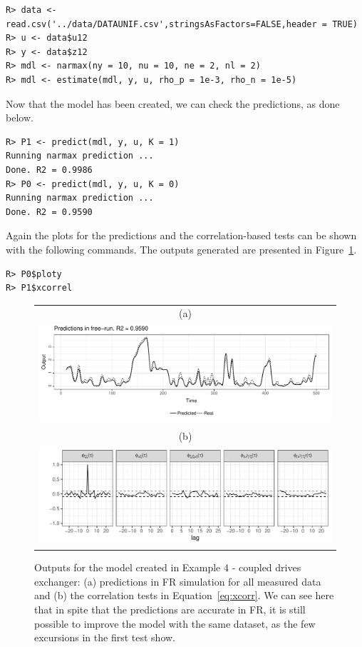 \documentclass[preprint,12pt, a4paper]{elsarticle}
\begin{document}
\begin{verbatim}
R> data <- read.csv('../data/DATAUNIF.csv',stringsAsFactors=FALSE,header = TRUE)
R> u <- data$u12
R> y <- data$z12
R> mdl <- narmax(ny = 10, nu = 10, ne = 2, nl = 2)
R> mdl <- estimate(mdl, y, u, rho_p = 1e-3, rho_n = 1e-5)
\end{verbatim}

Now that the model has been created, we can check the predictions, as done below. 

\begin{verbatim}
R> P1 <- predict(mdl, y, u, K = 1)
Running narmax prediction ... 
Done. R2 = 0.9986           
R> P0 <- predict(mdl, y, u, K = 0)
Running narmax prediction ... 
Done. R2 = 0.9590    
\end{verbatim}

Again the plots for the predictions and the correlation-based tests can be shown with the following commands. The outputs generated are presented in Figure~\ref{fig:ex4}.

\begin{verbatim}
R> P0$ploty
R> P1$xcorrel
\end{verbatim}

\begin{figure}[t!]
	\centering
	\begin{tabular}{c}
		(a) \\
		\includegraphics[width=15cm,keepaspectratio]{ex4y}  \\ 
		(b) \\
		\includegraphics[width=15cm,keepaspectratio]{ex4xc}
	\end{tabular}
	\caption{Outputs for the model created in Example 4 - coupled drives exchanger: (a) predictions in FR simulation for all measured data and (b) the correlation tests in Equation~\ref{eq:xcorr}. We can see here that in spite that the predictions are accurate in FR, it is still possible to improve the model with the same dataset, as the few excursions in the first test show.} \label{fig:ex4}
\end{figure}
\end{document}
